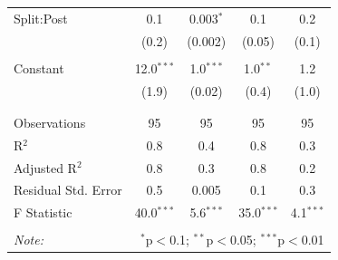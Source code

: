\documentclass[12pt, a4paper]{article}
\begin{document}
\begin{table}[!htbp]
\begin{tabular}{@{\extracolsep{5pt}}lcccc}
 Split:Post & 0.1 & 0.003$^{*}$ & 0.1 & 0.2 \\ 
  & (0.2) & (0.002) & (0.05) & (0.1) \\ 
  & & & & \\ 
 Constant & 12.0$^{***}$ & 1.0$^{***}$ & 1.0$^{**}$ & 1.2 \\ 
  & (1.9) & (0.02) & (0.4) & (1.0) \\ 
  & & & & \\ 
\hline \\[-1.8ex] 
Observations & 95 & 95 & 95 & 95 \\ 
R$^{2}$ & 0.8 & 0.4 & 0.8 & 0.3 \\ 
Adjusted R$^{2}$ & 0.8 & 0.3 & 0.8 & 0.2 \\ 
Residual Std. Error & 0.5 & 0.005 & 0.1 & 0.3 \\ 
F Statistic & 40.0$^{***}$ & 5.6$^{***}$ & 35.0$^{***}$ & 4.1$^{***}$ \\ 
\hline 
\hline \\[-1.8ex] 
\textit{Note:}  & \multicolumn{4}{r}{$^{*}$p$<$0.1; $^{**}$p$<$0.05; $^{***}$p$<$0.01} \\ 
\end{tabular} 
\end{table} %
\end{document}
